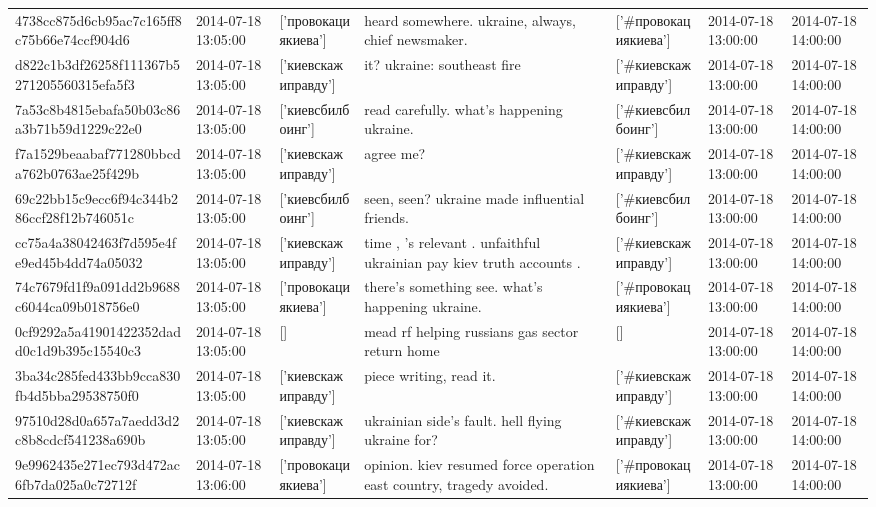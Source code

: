 \begin{tabular}{lllllll}
4738cc875d6cb95ac7c165ff8c75b66e74ccf904d6 & 2014-07-18 13:05:00 & ['провокациякиева'] & heard somewhere. ukraine, always, chief newsmaker. & ['#провокациякиева'] & 2014-07-18 13:00:00 & 2014-07-18 14:00:00 \\
d822c1b3df26258f111367b5271205560315efa5f3 & 2014-07-18 13:05:00 & ['киевскажиправду'] & it? ukraine: southeast fire & ['#киевскажиправду'] & 2014-07-18 13:00:00 & 2014-07-18 14:00:00 \\
7a53c8b4815ebafa50b03c86a3b71b59d1229c22e0 & 2014-07-18 13:05:00 & ['киевсбилбоинг'] & read carefully. what's happening ukraine. & ['#киевсбилбоинг'] & 2014-07-18 13:00:00 & 2014-07-18 14:00:00 \\
f7a1529beaabaf771280bbcda762b0763ae25f429b & 2014-07-18 13:05:00 & ['киевскажиправду'] & agree me? & ['#киевскажиправду'] & 2014-07-18 13:00:00 & 2014-07-18 14:00:00 \\
69c22bb15c9ecc6f94c344b286ccf28f12b746051c & 2014-07-18 13:05:00 & ['киевсбилбоинг'] & seen, seen? ukraine made influential friends. & ['#киевсбилбоинг'] & 2014-07-18 13:00:00 & 2014-07-18 14:00:00 \\
cc75a4a38042463f7d595e4fe9ed45b4dd74a05032 & 2014-07-18 13:05:00 & ['киевскажиправду'] & time , 's relevant . unfaithful ukrainian pay kiev truth accounts . & ['#киевскажиправду'] & 2014-07-18 13:00:00 & 2014-07-18 14:00:00 \\
74c7679fd1f9a091dd2b9688c6044ca09b018756e0 & 2014-07-18 13:05:00 & ['провокациякиева'] & there's something see. what's happening ukraine. & ['#провокациякиева'] & 2014-07-18 13:00:00 & 2014-07-18 14:00:00 \\
0cf9292a5a41901422352dadd0c1d9b395c15540c3 & 2014-07-18 13:05:00 & [] & mead rf helping russians gas sector return home & [] & 2014-07-18 13:00:00 & 2014-07-18 14:00:00 \\
3ba34c285fed433bb9cca830fb4d5bba29538750f0 & 2014-07-18 13:05:00 & ['киевскажиправду'] & piece writing, read it. & ['#киевскажиправду'] & 2014-07-18 13:00:00 & 2014-07-18 14:00:00 \\
97510d28d0a657a7aedd3d2c8b8cdcf541238a690b & 2014-07-18 13:05:00 & ['киевскажиправду'] & ukrainian side's fault. hell flying ukraine for? & ['#киевскажиправду'] & 2014-07-18 13:00:00 & 2014-07-18 14:00:00 \\
9e9962435e271ec793d472ac6fb7da025a0c72712f & 2014-07-18 13:06:00 & ['провокациякиева'] & opinion. kiev resumed force operation east country, tragedy avoided. & ['#провокациякиева'] & 2014-07-18 13:00:00 & 2014-07-18 14:00:00 \\

\end{tabular}
